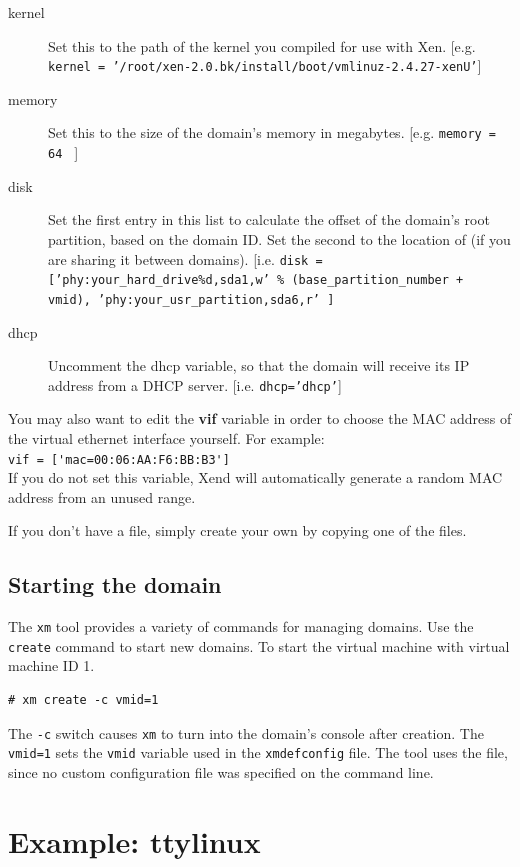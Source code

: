 \documentclass[11pt,twoside,final,openright]{xenstyle}
\begin{document}
\begin{description}
\item[kernel] Set this to the path of the kernel you compiled for use
              with Xen. [e.g. {\tt kernel =
              '/root/xen-2.0.bk/install/boot/vmlinuz-2.4.27-xenU'}]
\item[memory] Set this to the size of the domain's memory in
megabytes. [e.g. {\tt memory = 64 } ]
\item[disk] Set the first entry in this list to calculate the offset
of the domain's root partition, based on the domain ID.  Set the
second to the location of  (if you are sharing it between
domains). [i.e. {\tt disk = ['phy:your\_hard\_drive\%d,sda1,w' \%
(base\_partition\_number + vmid), 'phy:your\_usr\_partition,sda6,r' ]}
\item[dhcp] Uncomment the dhcp variable, so that the domain will
receive its IP address from a DHCP server. [i.e. {\tt dhcp='dhcp'}]
\end{description}

You may also want to edit the {\bf vif} variable in order to choose
the MAC address of the virtual ethernet interface yourself.  For
example: \\ \verb_vif = ['mac=00:06:AA:F6:BB:B3']_\\ If you do not set
this variable, Xend will automatically generate a random MAC address
from an unused range.

If you don't have a  file, simply create your own 
by copying one of the  files.
\subsection{Starting the domain}

The {\tt xm} tool provides a variety of commands for managing domains.
Use the {\tt create} command to start new domains.  To start the
virtual machine with virtual machine ID 1.

\begin{verbatim}
# xm create -c vmid=1
\end{verbatim}

The {\tt -c} switch causes {\tt xm} to turn into the domain's console
after creation.  The {\tt vmid=1} sets the {\tt vmid} variable used in
the {\tt xmdefconfig} file.  The tool uses the
 file, since no custom configuration file
was specified on the command line.

\section{Example: ttylinux}
\end{document}
